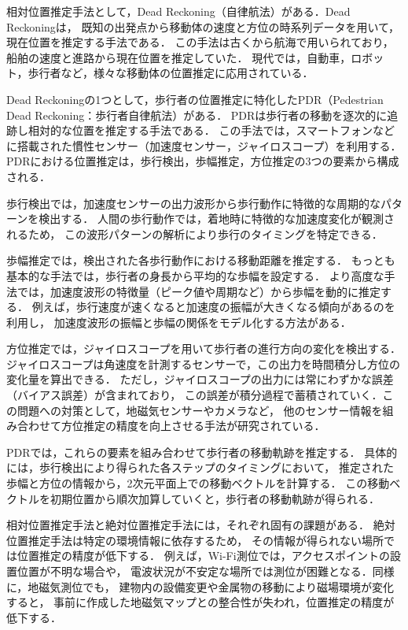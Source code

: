 相対位置推定手法として，Dead Reckoning（自律航法）がある．Dead Reckoningは，
既知の出発点から移動体の速度と方位の時系列データを用いて，現在位置を推定する手法である．
この手法は古くから航海で用いられており，船舶の速度と進路から現在位置を推定していた．
現代では，自動車，ロボット，歩行者など，様々な移動体の位置推定に応用されている．

Dead Reckoningの1つとして，歩行者の位置推定に特化したPDR（Pedestrian Dead Reckoning：歩行者自律航法）がある．
PDRは歩行者の移動を逐次的に追跡し相対的な位置を推定する手法である．
この手法では，スマートフォンなどに搭載された慣性センサー（加速度センサー，ジャイロスコープ）を利用する．
PDRにおける位置推定は，歩行検出，歩幅推定，方位推定の3つの要素から構成される．

歩行検出では，加速度センサーの出力波形から歩行動作に特徴的な周期的なパターンを検出する．
人間の歩行動作では，着地時に特徴的な加速度変化が観測されるため，
この波形パターンの解析により歩行のタイミングを特定できる．

歩幅推定では，検出された各歩行動作における移動距離を推定する．
もっとも基本的な手法では，歩行者の身長から平均的な歩幅を設定する．
より高度な手法では，加速度波形の特徴量（ピーク値や周期など）から歩幅を動的に推定する．
例えば，歩行速度が速くなると加速度の振幅が大きくなる傾向があるのを利用し，
加速度波形の振幅と歩幅の関係をモデル化する方法がある．

方位推定では，ジャイロスコープを用いて歩行者の進行方向の変化を検出する．
ジャイロスコープは角速度を計測するセンサーで，この出力を時間積分し方位の変化量を算出できる．
ただし，ジャイロスコープの出力には常にわずかな誤差（バイアス誤差）が含まれており，
この誤差が積分過程で蓄積されていく．この問題への対策として，地磁気センサーやカメラなど，
他のセンサー情報を組み合わせて方位推定の精度を向上させる手法が研究されている．

PDRでは，これらの要素を組み合わせて歩行者の移動軌跡を推定する．
具体的には，歩行検出により得られた各ステップのタイミングにおいて，
推定された歩幅と方位の情報から，2次元平面上での移動ベクトルを計算する．
この移動ベクトルを初期位置から順次加算していくと，歩行者の移動軌跡が得られる．

相対位置推定手法と絶対位置推定手法には，それぞれ固有の課題がある．
絶対位置推定手法は特定の環境情報に依存するため，
その情報が得られない場所では位置推定の精度が低下する．
例えば，Wi-Fi測位では，アクセスポイントの設置位置が不明な場合や，
電波状況が不安定な場所では測位が困難となる．同様に，地磁気測位でも，
建物内の設備変更や金属物の移動により磁場環境が変化すると，
事前に作成した地磁気マップとの整合性が失われ，位置推定の精度が低下する．

